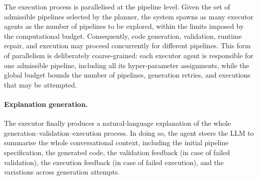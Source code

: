 \documentclass[runningheads]{llncs}
\newenvironment{inlinelist}{\begin{enumerate*}[label=\emph{(\roman*)}]}{\end{enumerate*}}
\begin{document}
The execution process is parallelised at the pipeline level.
%
Given the set of admissible pipelines selected by the planner,
the system spawns as many executor agents as the number of pipelines to be explored,
within the limits imposed by the computational budget.
%
Consequently,
code generation,
validation,
runtime repair,
and execution may proceed concurrently for different pipelines.
%
This form of parallelism is deliberately coarse-grained:
each executor agent is responsible for one admissible pipeline,
including all its hyper-parameter assignments,
while the global budget bounds the number of pipelines,
generation retries,
and executions that may be attempted.

\paragraph{Explanation generation.}


The executor finally produces a natural-language explanation
of the whole generation--validation--execution process.
%
In doing so,
the agent steers the \ac{LLM} to summarise the whole conversational context,
including the initial pipeline specification,
the generated code,
the validation feedback (in case of failed validation),
the execution feedback (in case of failed execution),
and the variations across generation attempts.

\end{document}
